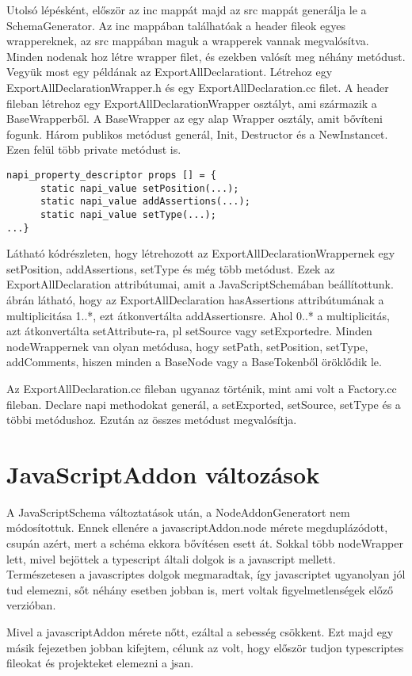 Utolsó lépésként, először az inc mappát majd az src mappát generálja le a SchemaGenerator.
Az inc mappában találhatóak a header fileok egyes wrappereknek, az src mappában maguk a wrapperek vannak megvalósítva.
Minden nodenak hoz létre wrapper filet, és ezekben valósít meg néhány metódust.
Vegyük most egy példának az ExportAllDeclarationt. Létrehoz egy ExportAllDeclarationWrapper.h és egy ExportAllDeclaration.cc filet.
A header fileban létrehoz egy ExportAllDeclarationWrapper osztályt, ami származik a BaseWrapperből. A BaseWrapper az egy alap Wrapper osztály, amit bővíteni fogunk.
Három publikos metódust generál, Init, Destructor és a NewInstancet.
Ezen felül több private metódust is.
\begin{lstlisting}[caption={ExportAllDeclaration.h file}, label={lst:ExportAllDeclaration_header}, language={CStyle}]
napi_property_descriptor props [] = {
      static napi_value setPosition(...);
      static napi_value addAssertions(...);
      static napi_value setType(...);
...}
\end{lstlisting}

Látható  kódrészleten, hogy létrehozott az ExportAllDeclarationWrappernek egy setPosition, addAssertions, setType és még több metódust.
Ezek az ExportAllDeclaration attribútumai, amit a JavaScriptSchemában beállítottunk.
 ábrán látható, hogy az ExportAllDeclaration hasAssertions attribútumának a multiplicitása 1..*, ezt átkonvertálta addAssertionsre.
Ahol 0..* a multiplicitás, azt átkonvertálta setAttribute-ra, pl setSource vagy setExportedre.
Minden nodeWrappernek van olyan metódusa, hogy setPath, setPosition, setType, addComments, hiszen minden a BaseNode vagy a BaseTokenből öröklődik le.

\noindent

Az ExportAllDeclaration.cc fileban ugyanaz történik, mint ami volt a Factory.cc fileban. Declare napi methodokat generál, a setExported, setSource, setType és a többi metódushoz.
Ezután az összes metódust megvalósítja.

\section{JavaScriptAddon változások}

\noindent

A JavaScriptSchema változtatások után, a NodeAddonGeneratort nem módosítottuk.
Ennek ellenére a javascriptAddon.node mérete megduplázódott, csupán azért, mert a schéma ekkora bővítésen esett át.
Sokkal több nodeWrapper lett, mivel bejöttek a typescript általi dolgok is a javascript mellett.
Természetesen a javascriptes dolgok megmaradtak, így javascriptet ugyanolyan jól tud elemezni, sőt néhány esetben jobban is, mert voltak figyelmetlenségek előző verzióban.

\noindent

Mivel a javascriptAddon mérete nőtt, ezáltal a sebesség csökkent.
Ezt majd egy másik fejezetben jobban kifejtem, célunk az volt, hogy először tudjon typescriptes fileokat és projekteket elemezni a jsan.
